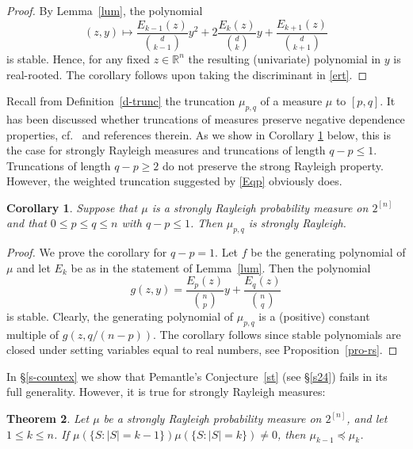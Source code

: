 \documentclass[10pt,reqno]{amsart}
\theoremstyle{plain}
\newtheorem{theorem}{Theorem}[section]
\newtheorem{corollary}[theorem]{Corollary}
\theoremstyle{definition}
\theoremstyle{remark}
\newcommand{\RR}{\mathbb{R}}
\newcommand{\pc}{\preccurlyeq}
\begin{document}
\begin{proof}
By Lemma~\ref{lum}, the polynomial 
\begin{equation}\label{ert}
 (z,y)\mapsto \frac {E_{k-1}(z)}{\binom {d}{k-1}}y^2+ 
2\frac {E_k(z)}{\binom {d}{k}}y + \frac {E_{k+1}(z)}{\binom {d}{k+1}}
 \end{equation}
 is stable. Hence, for any fixed $z \in \RR^n$ the resulting
(univariate) polynomial in $y$ is real-rooted. The corollary 
 follows upon taking the discriminant in \eqref{ert}. 
 \end{proof}

Recall from Definition~\ref{d-trunc} the truncation $\mu_{p,q}$ 
of a measure $\mu$ to $[p,q]$. It has been discussed whether truncations of 
measures preserve negative dependence properties, cf.~\cite{J-DP,P} and 
references therein. As we show in Corollary \ref{cor-trunc} below, this is 
the case for strongly Rayleigh measures and truncations of length 
$q-p \leq 1$. 
Truncations of length 
$q-p \geq 2$ do not preserve the strong Rayleigh property. However, the 
weighted truncation suggested by \eqref{Eqp} obviously does. 

\begin{corollary}\label{cor-trunc}
Suppose that $\mu$ is a strongly Rayleigh probability measure 
on $2^{[n]}$ and that $0 \leq p \leq q \leq n$ with $q-p \leq 1$. 
Then $\mu_{p,q}$ is strongly Rayleigh. 
\end{corollary}

\begin{proof}
We prove the corollary for $q-p=1$. Let $f$ be the generating polynomial of 
$\mu$ and let $E_k$ be as in the statement of Lemma~\ref{lum}. Then the 
polynomial 
\begin{equation}\label{pq}
 g(z,y)=\frac {E_p(z)}{\binom {n}{p}}y + \frac {E_q(z)}{\binom {n}{q}} 
\end{equation}
is stable. Clearly, the generating polynomial of $\mu_{p,q}$ is a (positive)
constant multiple of $g(z,q/(n-p))$. The corollary follows since stable 
polynomials are closed under setting variables equal to real numbers, 
see Proposition~\ref{pro-rs}. 
\end{proof}

In \S \ref{s-countex} we show that Pemantle's Conjecture~\ref{st} (see 
\S \ref{s24}) fails in its full generality. However, it is true for strongly 
Rayleigh measures: 

\begin{theorem}\label{stst}
Let $\mu$ be a strongly Rayleigh probability measure on $2^{[n]}$, 
and let $1\leq k \leq n$. If 
$\mu(\{S : |S|=k-1\})\mu(\{S:|S|=k\}) \neq 0$, then 
$\mu_{k-1} \pc \mu_k$.  
\end{theorem}
\end{document}

